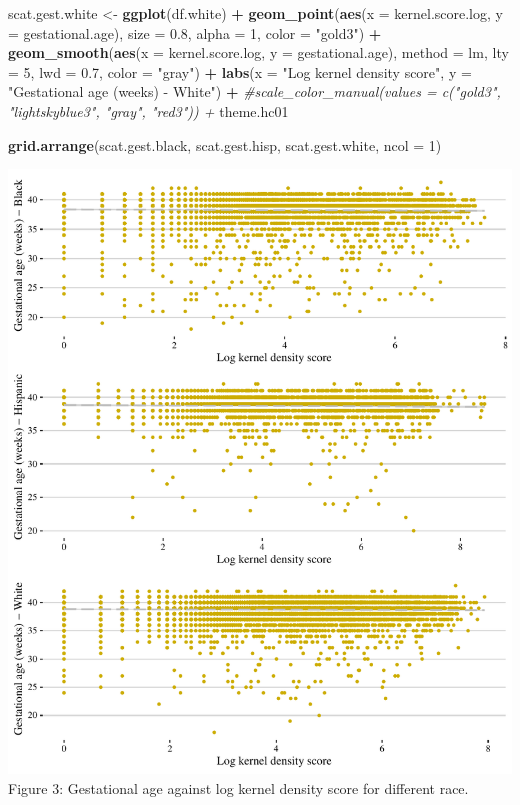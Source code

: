 \documentclass[
  12pt,
]{article}
\newenvironment{Shaded}{\begin{snugshade}}{\end{snugshade}}
\newcommand{\CommentTok}[1]{\textcolor[rgb]{0.56,0.35,0.01}{\textit{#1}}}
\newcommand{\DataTypeTok}[1]{\textcolor[rgb]{0.13,0.29,0.53}{#1}}
\newcommand{\DecValTok}[1]{\textcolor[rgb]{0.00,0.00,0.81}{#1}}
\newcommand{\FloatTok}[1]{\textcolor[rgb]{0.00,0.00,0.81}{#1}}
\newcommand{\KeywordTok}[1]{\textcolor[rgb]{0.13,0.29,0.53}{\textbf{#1}}}
\newcommand{\NormalTok}[1]{#1}
\newcommand{\OperatorTok}[1]{\textcolor[rgb]{0.81,0.36,0.00}{\textbf{#1}}}
\newcommand{\StringTok}[1]{\textcolor[rgb]{0.31,0.60,0.02}{#1}}
\begin{document}
\begin{Shaded}
\begin{Highlighting}[]
\NormalTok{scat.gest.white <-}\StringTok{ }\KeywordTok{ggplot}\NormalTok{(df.white) }\OperatorTok{+}
\StringTok{  }\KeywordTok{geom_point}\NormalTok{(}\KeywordTok{aes}\NormalTok{(}\DataTypeTok{x =}\NormalTok{ kernel.score.log, }\DataTypeTok{y =}\NormalTok{ gestational.age), }
             \DataTypeTok{size =} \FloatTok{0.8}\NormalTok{, }\DataTypeTok{alpha =} \DecValTok{1}\NormalTok{, }\DataTypeTok{color =} \StringTok{"gold3"}\NormalTok{) }\OperatorTok{+}\StringTok{ }
\StringTok{  }\KeywordTok{geom_smooth}\NormalTok{(}\KeywordTok{aes}\NormalTok{(}\DataTypeTok{x =}\NormalTok{ kernel.score.log, }\DataTypeTok{y =}\NormalTok{ gestational.age), }
              \DataTypeTok{method =}\NormalTok{ lm, }
              \DataTypeTok{lty =} \DecValTok{5}\NormalTok{, }\DataTypeTok{lwd =} \FloatTok{0.7}\NormalTok{, }\DataTypeTok{color =} \StringTok{"gray"}\NormalTok{) }\OperatorTok{+}
\StringTok{  }\KeywordTok{labs}\NormalTok{(}\DataTypeTok{x =} \StringTok{"Log kernel density score"}\NormalTok{, }
       \DataTypeTok{y =} \StringTok{"Gestational age (weeks) - White"}\NormalTok{) }\OperatorTok{+}
\StringTok{  }\CommentTok{#scale_color_manual(values = c("gold3", "lightskyblue3", "gray", "red3")) + }
\StringTok{  }\NormalTok{theme.hc01}

\KeywordTok{grid.arrange}\NormalTok{(scat.gest.black, scat.gest.hisp, scat.gest.white, }
             \DataTypeTok{ncol =} \DecValTok{1}\NormalTok{)}
\end{Highlighting}
\end{Shaded}

\includegraphics{ENV872_FINAL_CW_files/figure-latex/unnamed-chunk-7-1.pdf}
Figure 3: Gestational age against log kernel density score for different
race.
\end{document}

